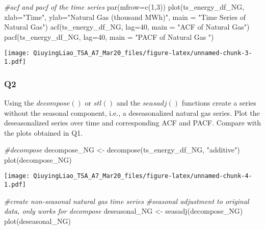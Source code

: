 \documentclass[
]{article}
\newenvironment{Shaded}{\begin{snugshade}}{\end{snugshade}}
\newcommand{\AttributeTok}[1]{\textcolor[rgb]{0.77,0.63,0.00}{#1}}
\newcommand{\CommentTok}[1]{\textcolor[rgb]{0.56,0.35,0.01}{\textit{#1}}}
\newcommand{\DecValTok}[1]{\textcolor[rgb]{0.00,0.00,0.81}{#1}}
\newcommand{\FunctionTok}[1]{\textcolor[rgb]{0.00,0.00,0.00}{#1}}
\newcommand{\NormalTok}[1]{#1}
\newcommand{\OtherTok}[1]{\textcolor[rgb]{0.56,0.35,0.01}{#1}}
\newcommand{\StringTok}[1]{\textcolor[rgb]{0.31,0.60,0.02}{#1}}
\begin{document}
\begin{Shaded}
\begin{Highlighting}[]
\CommentTok{\#acf and pacf of the time series}
\FunctionTok{par}\NormalTok{(}\AttributeTok{mfrow=}\FunctionTok{c}\NormalTok{(}\DecValTok{1}\NormalTok{,}\DecValTok{3}\NormalTok{))}
\FunctionTok{plot}\NormalTok{(ts\_energy\_df\_NG, }\AttributeTok{xlab=}\StringTok{"Time"}\NormalTok{, }\AttributeTok{ylab=}\StringTok{"Natural Gas (thousand MWh)"}\NormalTok{, }\AttributeTok{main =} \StringTok{"Time Series of Natural Gas"}\NormalTok{)}
\FunctionTok{acf}\NormalTok{(ts\_energy\_df\_NG, }\AttributeTok{lag=}\DecValTok{40}\NormalTok{, }\AttributeTok{main =} \StringTok{"ACF of Natural Gas"}\NormalTok{)}
\FunctionTok{pacf}\NormalTok{(ts\_energy\_df\_NG, }\AttributeTok{lag=}\DecValTok{40}\NormalTok{, }\AttributeTok{main =} \StringTok{"PACF of Natural Gas "}\NormalTok{)}
\end{Highlighting}
\end{Shaded}

\texttt{[image: QiuyingLiao\_TSA\_A7\_Mar20\_files/figure-latex/unnamed-chunk-3-1.pdf]}

\hypertarget{q2}{%
\subsubsection{Q2}\label{q2}}

Using the \(decompose()\) or \(stl()\) and the \(seasadj()\) functions
create a series without the seasonal component, i.e., a deseasonalized
natural gas series. Plot the deseasonalized series over time and
corresponding ACF and PACF. Compare with the plots obtained in Q1.

\begin{Shaded}
\begin{Highlighting}[]
\CommentTok{\#decompose}
\NormalTok{decompose\_NG }\OtherTok{\textless{}{-}} \FunctionTok{decompose}\NormalTok{(ts\_energy\_df\_NG, }\StringTok{"additive"}\NormalTok{) }
\FunctionTok{plot}\NormalTok{(decompose\_NG)}
\end{Highlighting}
\end{Shaded}

\texttt{[image: QiuyingLiao\_TSA\_A7\_Mar20\_files/figure-latex/unnamed-chunk-4-1.pdf]}

\begin{Shaded}
\begin{Highlighting}[]
\CommentTok{\#create non{-}seasonal natural gas time series}
\CommentTok{\#seasonal adjustment to original data, only works for decompose}
\NormalTok{deseasonal\_NG }\OtherTok{\textless{}{-}} \FunctionTok{seasadj}\NormalTok{(decompose\_NG) }
\FunctionTok{plot}\NormalTok{(deseasonal\_NG)}
\end{Highlighting}
\end{Shaded}
\end{document}
